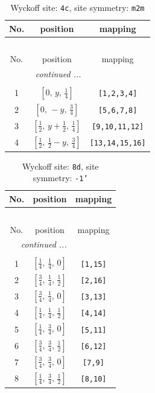 \documentclass[fleqn,8pt]{jsarticle}
\begin{document}
\renewcommand{\arraystretch}{1.2}
\begin{longtable}{ccc}
\caption{Wyckoff site: {\tt 4c}, site symmetry: {\tt m2m}}
 \\
 \hline \hline
No. & position & mapping \\ \hline \endfirsthead

\multicolumn{2}{l}{\tablename\ \thetable{}} \\
 \hline \hline
No. & position & mapping \\ \hline \endhead

 \hline \hline
\multicolumn{2}{r}{\footnotesize\it continued ...} \\ \endfoot

 \hline \hline
\multicolumn{2}{r}{} \\ \endlastfoot

1 & $\left[ 0,\, y,\, \frac{1}{4} \right]$ & {\tt [1,2,3,4]} \\ \hline
2 & $\left[ 0,\, - y,\, \frac{3}{4} \right]$ & {\tt [5,6,7,8]} \\ \hline
3 & $\left[ \frac{1}{2},\, y + \frac{1}{2},\, \frac{1}{4} \right]$ & {\tt [9,10,11,12]} \\ \hline
4 & $\left[ \frac{1}{2},\, \frac{1}{2} - y,\, \frac{3}{4} \right]$ & {\tt [13,14,15,16]} \\
\end{longtable}
\renewcommand{\arraystretch}{1.2}
\begin{longtable}{ccc}
\caption{Wyckoff site: {\tt 8d}, site symmetry: {\tt -1'}}
 \\
 \hline \hline
No. & position & mapping \\ \hline \endfirsthead

\multicolumn{2}{l}{\tablename\ \thetable{}} \\
 \hline \hline
No. & position & mapping \\ \hline \endhead

 \hline \hline
\multicolumn{2}{r}{\footnotesize\it continued ...} \\ \endfoot

 \hline \hline
\multicolumn{2}{r}{} \\ \endlastfoot

1 & $\left[ \frac{1}{4},\, \frac{1}{4},\, 0 \right]$ & {\tt [1,15]} \\ \hline
2 & $\left[ \frac{3}{4},\, \frac{1}{4},\, \frac{1}{2} \right]$ & {\tt [2,16]} \\ \hline
3 & $\left[ \frac{3}{4},\, \frac{1}{4},\, 0 \right]$ & {\tt [3,13]} \\ \hline
4 & $\left[ \frac{1}{4},\, \frac{1}{4},\, \frac{1}{2} \right]$ & {\tt [4,14]} \\ \hline
5 & $\left[ \frac{1}{4},\, \frac{3}{4},\, 0 \right]$ & {\tt [5,11]} \\ \hline
6 & $\left[ \frac{3}{4},\, \frac{3}{4},\, \frac{1}{2} \right]$ & {\tt [6,12]} \\ \hline
7 & $\left[ \frac{3}{4},\, \frac{3}{4},\, 0 \right]$ & {\tt [7,9]} \\ \hline
8 & $\left[ \frac{1}{4},\, \frac{3}{4},\, \frac{1}{2} \right]$ & {\tt [8,10]} \\
\end{longtable}
\end{document}
